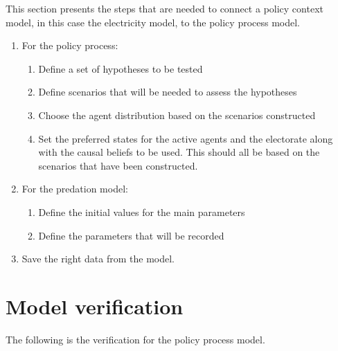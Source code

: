 \documentclass[12pt]{article}
\begin{document}
This section presents the steps that are needed to connect a policy context model, in this case the electricity model, to the policy process model.

\begin{enumerate}
\item For the policy process:
	\begin{enumerate}
	\item Define a set of hypotheses to be tested
	\item Define scenarios that will be needed to assess the hypotheses
	\item Choose the agent distribution based on the scenarios constructed
	\item Set the preferred states for the active agents and the electorate along with the causal beliefs to be used. This should all be based on the scenarios that have been constructed.
	\end{enumerate}

\item For the predation model:
	\begin{enumerate}
	\item Define the initial values for the main parameters
	\item Define the parameters that will be recorded
	\end{enumerate}
\item Save the right data from the model.
\end{enumerate}

\section{Model verification}
\label{sec:}

The following is the verification for the policy process model.
\end{document}
